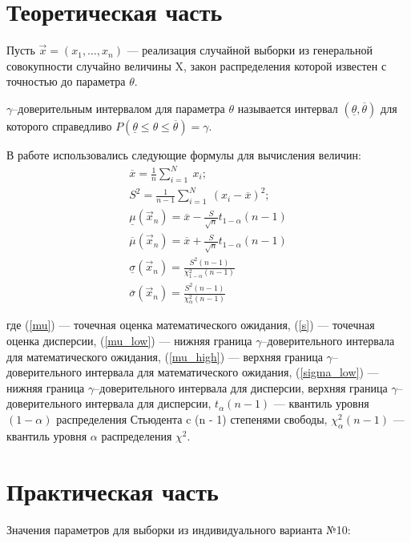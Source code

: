 \chapter{Теоретическая часть}

Пусть $\vec{x} = (x_1, \dots, x_n)$ --- реализация случайной выборки из генеральной совокупности случайно величины X, закон распределения которой известен с точностью до параметра $\theta$.

$\gamma$--доверительным интервалом для параметра $\theta$ называется интервал $(\underline{\theta}, \overline{\theta})$ для которого справедливо $P(\underline{\theta} \leq \theta \leq \overline{\theta}) = \gamma$.

В работе использовались следующие формулы для вычисления величин:
\begin{gather}
	\label{mu}
	\overline{x} = \frac{1}{n}\sum_{i = 1}^{N}~x_i;\\
	\label{s}
	S^2 = \frac{1}{n - 1}\sum_{i = 1}^{N}~(x_i - \overline{x})^2;\\
	\label{mu_low}
	\underline{\mu}(\vec{x}_n) = \overline{x} - \frac{S}{\sqrt{n}}t_{1-\alpha}(n-1)\\
	\label{mu_high}
	\overline{\mu}(\vec{x}_n) = \overline{x} + \frac{S}{\sqrt{n}}t_{1-\alpha}(n-1)\\
	\label{sigma_low}
	\underline{\sigma}(\vec{x}_n) = \frac{S^2(n-1)}{\chi^2_{1-\alpha}(n-1)}\\
	\label{sigma_high}
	\overline{\sigma}(\vec{x}_n) = \frac{S^2(n-1)}{\chi^2_\alpha(n-1)}
\end{gather}

где (\ref{mu}) --- точечная оценка математического ожидания, (\ref{s}) --- точечная оценка дисперсии, (\ref{mu_low}) --- нижняя граница $\gamma$--доверительного интервала для математического ожидания, (\ref{mu_high}) --- верхняя граница $\gamma$--доверительного интервала для математического ожидания, (\ref{sigma_low}) --- нижняя граница $\gamma$--доверительного интервала для дисперсии, верхняя граница $\gamma$--доверительного интервала для дисперсии, $t_{\alpha}(n-1)$ --- квантиль уровня $(1 - \alpha)$ распределения Стьюдента c (n - 1) степенями свободы, $\chi^2_{\alpha}(n-1)$ --- квантиль уровня $\alpha$ распределения $\chi^2$.

\chapter{Практическая часть}

Значения параметров для выборки из индивидуального варианта №10:

